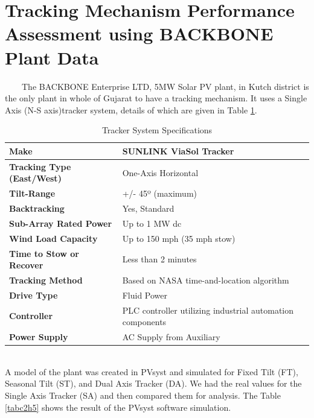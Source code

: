 \section{Tracking Mechanism Performance Assessment using BACKBONE Plant Data}
\
\
\
\
The BACKBONE Enterprise LTD, 5MW Solar PV plant, in Kutch district is the only plant in whole of Gujarat to have a tracking mechanism. It uses a Single Axis (N-S axis)tracker system, details of which are given in Table \ref{tabc2h4}.
\\
\begin{table}[H]
  \centering
    \begin{tabular}{|l|l|}
    \hline
    \textbf{Make} & SUNLINK  ViaSol Tracker \\
    \hline
    \textbf{Tracking Type (East/West)} & One-Axis Horizontal \\
    \hline
    \textbf{Tilt-Range} & +/- 45º (maximum) \\
    \hline
    \textbf{Backtracking} & Yes, Standard \\
    \hline
    \textbf{Sub-Array Rated Power} & Up to 1 MW dc \\
    \hline
    \textbf{Wind Load Capacity} & Up to 150 mph (35 mph stow) \\
    \hline
    \textbf{Time to Stow or Recover} & Less than 2 minutes \\
    \hline
    \textbf{Tracking Method} & Based on NASA time-and-location algorithm \\
    \hline
    \textbf{Drive Type} & Fluid Power \\
    \hline
    \textbf{Controller} & PLC controller utilizing industrial automation components \\
    \hline
    \textbf{Power Supply} & AC Supply from Auxiliary \\
    \hline
    \end{tabular}
    \caption{Tracker System Specifications}
    \label{tabc2h4}
\end{table}
\\
A model of the plant was created in PVsyst and simulated for Fixed Tilt (FT), Seasonal Tilt (ST), and Dual Axis Tracker (DA). We had the real values for the Single Axis Tracker (SA) and then compared them for analysis. The Table \ref{tabc2h5} shows the result of the PVsyst software simulation. 
\\

